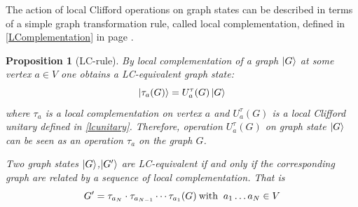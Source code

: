 \documentclass[10pt,a4paper]{book}
\numberwithin{equation}{chapter}
\numberwithin{figure}{chapter}
\numberwithin{table}{chapter}
\newtheorem{prop}{Proposition}[section]
\begin{document}
The action of local Clifford operations on graph states can be described in terms of a simple graph transformation rule, called local complementation, defined in  \ref{LComplementation} in page \pageref{LComplementation}.

\begin{prop}[LC-rule] By local complementation of a graph $\ket{G}$ at some vertex $a\in V$ one obtains a LC-equivalent graph state:
\begin{equation}
\ket{\tau_{a}(G)}=U^{\tau}_{a}(G)\ket{G}
\end{equation}
where $\tau_a$ is a local complementation on vertex $a$ and $U^{\tau}_{a}(G)$ is a local Clifford unitary defined in \autoref{lcunitary}. Therefore, operation $U^{\tau}_{a}(G)$ on graph state $\ket{G}$ can be seen as an operation $\tau_a$ on the graph $G$.

Two graph states $\ket{G}$,$\ket{G'}$ are LC-equivalent if and only if the corresponding graph are related by a sequence of local complementation. That is
\begin{equation}
G'=\tau_{a_N}\cdot \tau_{a_{N-1}} \cdots \tau_{a_1}(G) \: \textup{with} \: \ a_{1}\ldots a_{N} \in V
\end{equation}
\end{prop}
\end{document}
